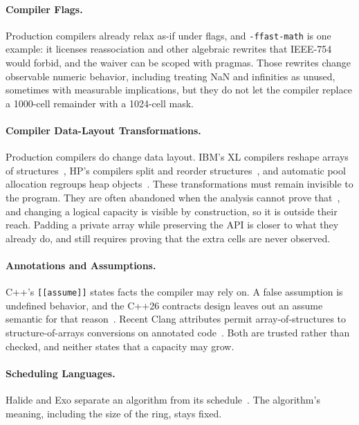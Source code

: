 \paragraph{Compiler Flags.}
Production compilers already relax as-if under flags, and
\texttt{-ffast-math} is one example: it licenses reassociation and other
algebraic rewrites that IEEE-754 would forbid, and the waiver can be scoped
with pragmas. Those rewrites change observable numeric behavior, including
treating NaN and infinities as unused, sometimes with measurable
implications, but they do not let the compiler replace a 1000-cell remainder
with a 1024-cell mask.

\paragraph{Compiler Data-Layout Transformations.}
Production compilers do change data layout. IBM's XL compilers reshape arrays
of structures~\cite{zhao2007forma}, HP's compilers split and reorder
structures~\cite{hundt2006practical}, and automatic pool allocation regroups
heap objects~\cite{lattner2005pool}. These transformations must remain
invisible to the program. They are often abandoned when the analysis cannot
prove that~\cite{hundt2006practical}, and changing a logical capacity is
visible by construction, so it is outside their reach. Padding a private array while
preserving the API is closer to what they already do, and still requires
proving that the extra cells are never observed.

\paragraph{Annotations and Assumptions.}
C++'s \texttt{[[assume]]} states facts the compiler may rely on. A false
assumption is undefined behavior, and the C++26 contracts design leaves out an
assume semantic for that reason~\cite{p2899r1}. Recent Clang attributes permit
array-of-structures to structure-of-arrays conversions on annotated
code~\cite{radtke2025annotation}. Both are trusted rather than checked, and
neither states that a capacity may grow.

\paragraph{Scheduling Languages.}
Halide and Exo separate an algorithm from its schedule~\cite{ragan2013halide,
ikarashi2022exo}. The algorithm's meaning, including the size of the ring,
stays fixed.

